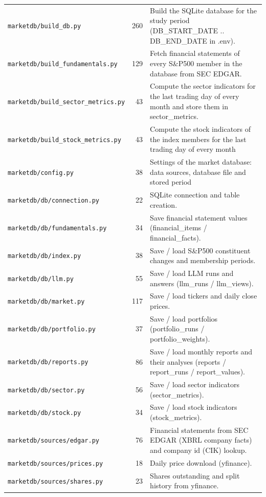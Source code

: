 \documentclass[xelatex,ja=standard,jafont=hiragino-pron,a4paper,10pt]{bxjsreport}
\begin{document}
{\begin{longtable}{p{5.20cm}rp{8.20cm}}
\texttt{marketdb/build\_\allowbreak{}db.py} & 260 & Build the SQLite database for the study period (DB\_START\_DATE .. DB\_END\_DATE in .env). \\
\texttt{marketdb/\allowbreak{}build\_\allowbreak{}fundamentals.\allowbreak{}py} & 129 & Fetch financial statements of every S\&P500 member in the database from SEC EDGAR. \\
\texttt{marketdb/\allowbreak{}build\_\allowbreak{}sector\_\allowbreak{}metrics.\allowbreak{}py} & 43 & Compute the sector indicators for the last trading day of every month and store them in sector\_metrics. \\
\texttt{marketdb/\allowbreak{}build\_\allowbreak{}stock\_\allowbreak{}metrics.\allowbreak{}py} & 43 & Compute the stock indicators of the index members for the last trading day of every month \\
\texttt{marketdb/config.py} & 38 & Settings of the market database: data sources, database file and stored period \\
\texttt{marketdb/db/connection.py} & 22 & SQLite connection and table creation. \\
\texttt{marketdb/db/fundamentals.py} & 34 & Save financial statement values (financial\_items / financial\_facts). \\
\texttt{marketdb/db/index.py} & 38 & Save / load S\&P500 constituent changes and membership periods. \\
\texttt{marketdb/db/llm.py} & 55 & Save / load LLM runs and answers (llm\_runs / llm\_views). \\
\texttt{marketdb/db/market.py} & 117 & Save / load tickers and daily close prices. \\
\texttt{marketdb/db/portfolio.py} & 37 & Save / load portfolios (portfolio\_runs / portfolio\_weights). \\
\texttt{marketdb/db/reports.py} & 86 & Save / load monthly reports and their analyses (reports / report\_runs / report\_values). \\
\texttt{marketdb/db/sector.py} & 56 & Save / load sector indicators (sector\_metrics). \\
\texttt{marketdb/db/stock.py} & 34 & Save / load stock indicators (stock\_metrics). \\
\texttt{marketdb/sources/edgar.py} & 76 & Financial statements from SEC EDGAR (XBRL company facts) and company id (CIK) lookup. \\
\texttt{marketdb/sources/prices.py} & 18 & Daily price download (yfinance). \\
\texttt{marketdb/sources/shares.py} & 23 & Shares outstanding and split history from yfinance. \\

\end{longtable}}
\end{document}
